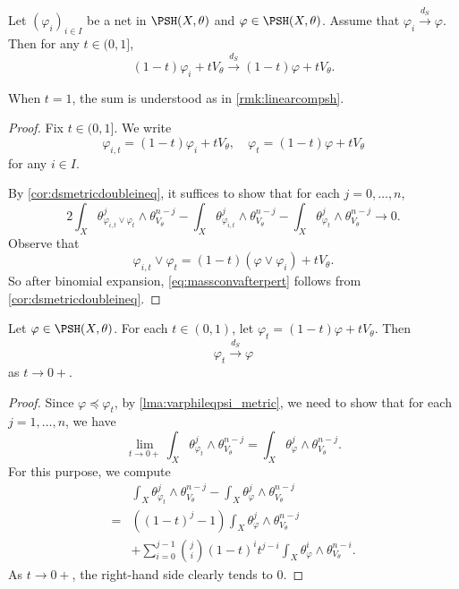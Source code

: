 \begin{lemma}\label{lma:dsconvpertV}
    Let $(\varphi_i)_{i\in I}$ be a net in $\PSH(X,\theta)$ and $\varphi\in \PSH(X,\theta)$. Assume that $\varphi_i\xrightarrow{d_S}\varphi$. Then for any $t\in (0,1]$,
    \[
    (1-t)\varphi_i+ tV_{\theta}\xrightarrow{d_S}(1-t)\varphi+ tV_{\theta}.
    \]
\end{lemma}
 When $t=1$, the sum is understood as in \cref{rmk:linearcompsh}.
\begin{proof}
    Fix $t\in (0,1]$. We write
    \[
    \varphi_{i,t}=(1-t)\varphi_i+ tV_{\theta},\quad \varphi_t=(1-t)\varphi+ tV_{\theta}
    \]
    for any $i\in I$.

    By \cref{cor:dsmetricdoubleineq}, it suffices to show that for each $j=0,\ldots,n$,
    \begin{equation}\label{eq:massconvafterpert}
    2\int_X \theta_{\varphi_{i,t}\lor \varphi_t}^j\wedge \theta_{V_{\theta}}^{n-j}-\int_X \theta_{\varphi_{i,t}}^j\wedge \theta_{V_{\theta}}^{n-j}-\int_X \theta_{\varphi_t}^j\wedge \theta_{V_{\theta}}^{n-j}\to 0.
    \end{equation}
    Observe that
    \[
    \varphi_{i,t}\lor \varphi_t=(1-t)(\varphi\lor \varphi_i)+t V_{\theta}.
    \]
    So after binomial expansion, \eqref{eq:massconvafterpert} follows from \cref{cor:dsmetricdoubleineq}.
\end{proof}

\begin{lemma}\label{lma:linearpertbyVtheta}
    Let $\varphi\in \PSH(X,\theta)$. For each $t\in (0,1)$, let $\varphi_t=(1-t)\varphi+t V_{\theta}$. Then
    \[
        \varphi_t\xrightarrow{d_S}\varphi
    \]
    as $t\to 0+$.
\end{lemma}
\begin{proof}
    Since $\varphi\preceq\varphi_t$, by \cref{lma:varphileqpsi_metric}, we need to show that for each $j=1,\dots,n$, we have
    \[
        \lim_{t\to 0+} \int_X \theta_{\varphi_t}^j\wedge \theta_{V_{\theta}}^{n-j}=\int_X \theta_{\varphi}^j\wedge \theta_{V_{\theta}}^{n-j}.
    \]
    For this purpose, we compute
    \[
        \begin{aligned}
            & \int_X \theta_{\varphi_t}^j\wedge \theta_{V_{\theta}}^{n-j}- \int_X \theta_{\varphi}^j\wedge \theta_{V_{\theta}}^{n-j}\\
            =&\left((1-t)^j-1\right)\int_X \theta_{\varphi}^j\wedge \theta_{V_{\theta}}^{n-j}\\
            &+\sum_{i=0}^{j-1} \binom{j}{i}(1-t)^i t^{j-i}\int_X\theta_{\varphi}^i\wedge \theta_{V_{\theta}}^{n-i}.
        \end{aligned}
    \]
    As $t\to 0+$, the right-hand side clearly tends to $0$.
\end{proof}


